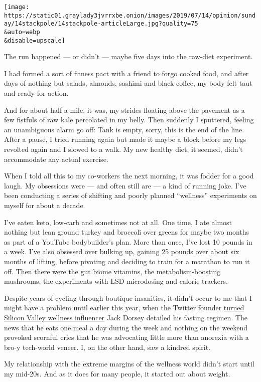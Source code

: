 \texttt{[image: https://static01.graylady3jvrrxbe.onion/images/2019/07/14/opinion/sunday/14stackpole/14stackpole-articleLarge.jpg?quality=75\\\&auto=webp\\\&disable=upscale]}

The run happened --- or didn't --- maybe five days into the raw-diet
experiment.

I had formed a sort of fitness pact with a friend to forgo cooked food,
and after days of nothing but salads, almonds, sashimi and black coffee,
my body felt taut and ready for action.

And for about half a mile, it was, my strides floating above the
pavement as a few fistfuls of raw kale percolated in my belly. Then
suddenly I sputtered, feeling an unambiguous alarm go off: Tank is
empty, sorry, this is the end of the line. After a pause, I tried
running again but made it maybe a block before my legs revolted again
and I slowed to a walk. My new healthy diet, it seemed, didn't
accommodate any actual exercise.

When I told all this to my co-workers the next morning, it was fodder
for a good laugh. My obsessions were --- and often still are --- a kind
of running joke. I've been conducting a series of shifting and poorly
planned ``wellness'' experiments on myself for about a decade.

I've eaten keto, low-carb and sometimes not at all. One time, I ate
almost nothing but lean ground turkey and broccoli over greens for maybe
two months as part of a YouTube bodybuilder's plan. More than once, I've
lost 10 pounds in a week. I've also obsessed over bulking up, gaining 25
pounds over about six months of lifting, before pivoting and deciding to
train for a marathon to run it off. Then there were the gut biome
vitamins, the metabolism-boosting mushrooms, the experiments with LSD
microdosing and calorie trackers.

Despite years of cycling through boutique insanities, it didn't occur to
me that I might have a problem until earlier this year, when the Twitter
founder
\href{https://www.nytimes3xbfgragh.onion/2019/05/02/fashion/jack-dorsey-influencer.html}{turned
Silicon Valley wellness influencer} Jack Dorsey detailed his fasting
regimen. The news that he eats one meal a day during the week and
nothing on the weekend provoked scornful cries that he was advocating
little more than anorexia with a bro-y tech-world veneer. I, on the
other hand, saw a kindred spirit.

My relationship with the extreme margins of the wellness world didn't
start until my mid-20s. And as it does for many people, it started out
about weight.

